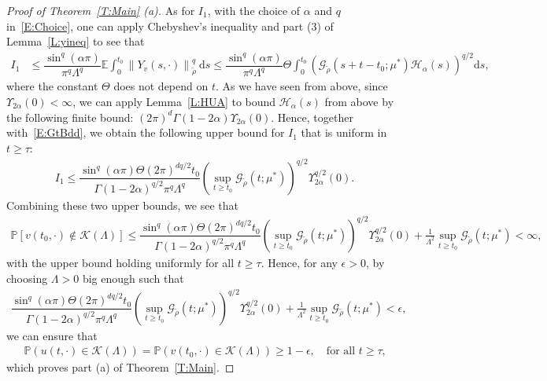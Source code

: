 \documentclass[a4paper,11pt]{article}%
\theoremstyle{plain}
\theoremstyle{definition}
\numberwithin{equation}{section}
\newcommand{\E}{\mathbb{E}}
\newcommand{\Norm}[1]{\left\| #1 \right\|}
\newcommand{\ud}{\ensuremath{\mathrm{d}}}
\begin{document}
\begin{proof}[Proof of Theorem~\ref{T:Main} (a)]
  As for $I_1$, with the choice of $\alpha$ and $q$ in~\eqref{E:Choice}, one can apply Chebyshev's
  inequality and part (3) of Lemma~\ref{L:yineq} to see that
  \begin{align*}
    I_1 & \le \dfrac{\sin^q (\alpha \pi)}{\pi^q \Lambda^q}\E \int_{0}^{t_0} \Norm{Y_v(s,\cdot)}_{\tilde{\rho}}^q \: \ud s
          \le \dfrac{\sin^q (\alpha \pi)}{\pi^q \Lambda^q} \Theta\int_0^{t_0}
          \left(\mathcal{G}_{\tilde{\rho}}(s + t-t_0;\mu^*) \mathcal{H}_{\alpha}(s)\right)^{q/2} \ud s,
  \end{align*}
  where the constant $\Theta$ does not depend on $t$. As we have seen from above, since
  $\Upsilon_{2\alpha}(0)<\infty$, we can apply Lemma~\ref{L:HUA} to bound $\mathcal{H}_{\alpha}(s)$
  from above by the following finite bound: $\left(2\pi\right)^d \Gamma(1-2\alpha) \Upsilon_{2\alpha}(0)$.
  Hence, together with~\eqref{E:GtBdd}, we obtain the following upper bound for $I_1$ that is
  uniform in $t\ge \tau$:
  \begin{align*}
    I_1 \le \dfrac{\sin^q (\alpha \pi)\Theta (2\pi)^{dq/2} t_0}{\Gamma\left(1-2\alpha\right)^{q/2}\pi^q \Lambda^q} \left(\sup_{t\ge t_0} \mathcal{G}_{\tilde{\rho}}\left(t;\mu^*\right)\right)^{q/2} \Upsilon_{2\alpha}^{q/2}(0).
  \end{align*}
  Combining these two upper bounds, we see that
  \begin{align*}
    \mathbb{P} \left[ v(t_0,\cdot) \not \in \mathscr{K}(\Lambda) \right ]
    \le
    \dfrac{\sin^q (\alpha \pi)\Theta (2\pi)^{dq/2} t_0}{\Gamma\left(1-2\alpha\right)^{q/2}\pi^q \Lambda^q} \left(\sup_{t\ge t_0} \mathcal{G}_{\tilde{\rho}}\left(t;\mu^*\right)\right)^{q/2} \Upsilon_{2\alpha}^{q/2}(0)
    +
    \frac{1}{\Lambda^2} \sup_{t\ge t_0} \mathcal{G}_{\tilde{\rho}}\left(t;\mu^*\right)
    <\infty,
  \end{align*}
  with the upper bound holding uniformly for all $t\ge \tau$. Hence, for any $\epsilon>0$, by
  choosing $\Lambda > 0$ big enough such that
  \begin{align*}
    \dfrac{\sin^q (\alpha \pi)\Theta (2\pi)^{dq/2} t_0}{\Gamma\left(1-2\alpha\right)^{q/2}\pi^q \Lambda^q} \left(\sup_{t\ge t_0} \mathcal{G}_{\tilde{\rho}}\left(t;\mu^*\right)\right)^{q/2} \Upsilon_{2\alpha}^{q/2}(0)
    +
    \frac{1}{\Lambda^2} \sup_{t\ge t_0} \mathcal{G}_{\tilde{\rho}}\left(t;\mu^*\right)
    < \epsilon,
  \end{align*}
  we can ensure that
  \begin{align*}
      \mathbb{P}\left(u(t,\cdot) \in \mathscr{K}(\Lambda)\right)
    = \mathbb{P}\left(v(t_0,\cdot) \in \mathscr{K}(\Lambda)\right)
    \ge 1- \epsilon, \quad \text{for all $t\ge \tau$,}
  \end{align*}
  which proves part (a) of Theorem~\ref{T:Main}.
\end{proof}
\end{document}

